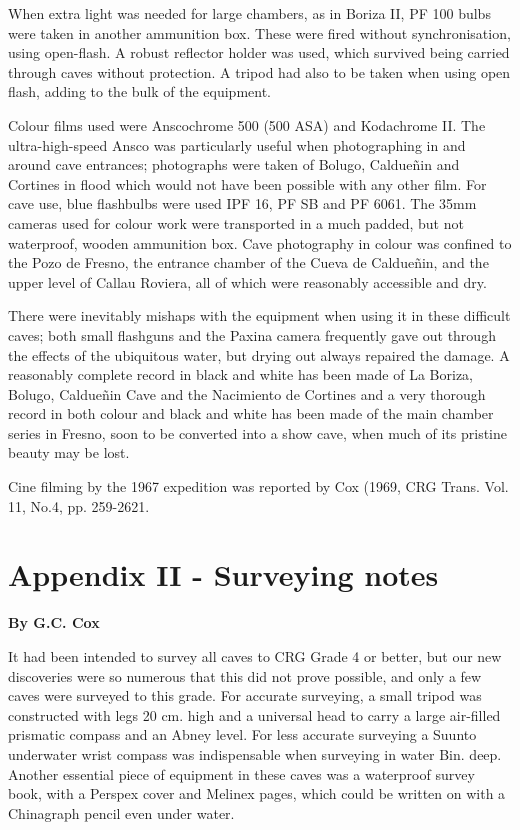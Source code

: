 \documentclass[11pt, a4paper, twoside]{memoir}
\begin{document}
When extra light was needed for large chambers, as in Boriza II, PF 100 bulbs were taken in another ammunition box. These were fired without synchronisation, using open-flash. A robust reflector holder was used, which survived being carried through caves without protection. A tripod had also to be taken when using open flash, adding to the bulk of the equipment.

Colour films used were Anscochrome 500 (500 ASA) and Kodachrome II. The ultra-high-speed Ansco was particularly useful when photographing in and around cave entrances; photographs were taken of Bolugo, Caldueñin and Cortines in flood which would not have been possible with any other film. For cave use, blue flashbulbs were used IPF 16, PF SB and PF 6061. The 35mm cameras used for colour work were transported in a much padded, but not waterproof, wooden ammunition box. Cave photography in colour was confined to the Pozo de Fresno, the entrance chamber of the Cueva de Caldueñin, and the upper level of Callau Roviera, all of which were reasonably accessible and dry.

There were inevitably mishaps with the equipment when using it in these difficult caves; both small flashguns and the Paxina camera frequently gave out through the effects of the ubiquitous water, but drying out always repaired the damage. A reasonably complete record in black and white has been made of La Boriza, Bolugo, Caldueñin Cave and the Nacimiento de Cortines and a very thorough record in both colour and black and white has been made of the main chamber series in Fresno, soon to be converted into a show cave, when much of its pristine beauty may be lost.

Cine filming by the 1967 expedition was reported by Cox (1969, CRG Trans. Vol. 11, No.4, pp. 259-2621.




\chapter*{Appendix II - Surveying notes}
\textbf{By G.C. Cox}

It had been intended to survey all caves to CRG Grade 4 or better, but our new discoveries were so numerous that this did not prove possible, and only a few caves were surveyed to this grade. For accurate surveying, a small tripod was constructed with legs 20 cm. high and a universal head to carry a large air-filled prismatic compass and an Abney level. For less accurate surveying a Suunto underwater wrist compass was indispensable when surveying in water Bin. deep. Another essential piece of equipment in these caves was a waterproof survey book, with a Perspex cover and Melinex pages, which could be written on with a Chinagraph pencil even under water.
\end{document}
